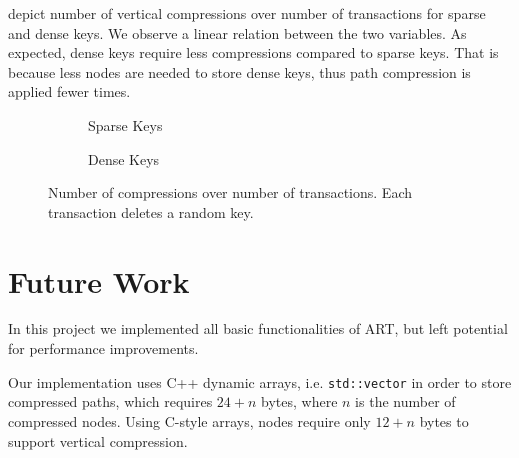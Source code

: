 \documentclass[abstracton,12pt]{scrartcl}
\theoremstyle{definition}
\begin{document}
 depict number of vertical
compressions over number of transactions for sparse and dense keys. 
We observe a linear relation between the two variables. As expected, 
dense keys require less compressions compared to sparse keys. That is because 
less nodes are needed to store dense keys, thus path compression is applied
fewer times.

\begin{figure}[H]
  \centering
  \begin{subfigure}[b]{0.49\textwidth}
    \caption{Sparse Keys}
    \label{fig:compressions-sparse}
  \end{subfigure}
  \begin{subfigure}[b]{0.49\textwidth}
    \caption{Dense Keys}
    \label{fig:compressions-dense}
  \end{subfigure}
  \caption{Number of compressions over number of transactions. Each transaction
  deletes a random key.}
\end{figure}

\section{Future Work}
\label{sec:future-work}

In this project we implemented all basic functionalities of ART, but left 
potential for performance improvements.

Our implementation uses C++ dynamic arrays, i.e. \texttt{std::vector} in order
to store compressed paths, which requires $24 + n$ bytes, where $n$ is the
number of compressed nodes. Using C-style arrays, nodes require only $12 + n$
bytes to support vertical compression.
\end{document}
